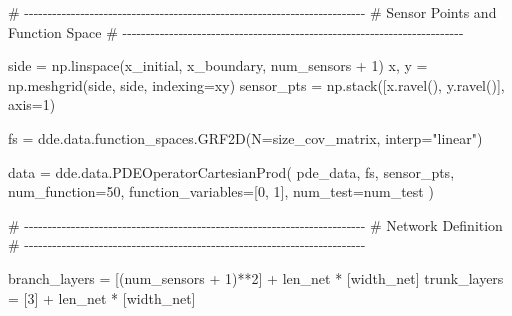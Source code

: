 \documentclass[
  spanish,
  us-letterpaper,
  DIV=11,
  numbers=noendperiod]{scrreprt}
\newenvironment{Shaded}{\begin{snugshade}}{\end{snugshade}}
\newcommand{\CommentTok}[1]{\textcolor[rgb]{0.37,0.37,0.37}{#1}}
\newcommand{\DecValTok}[1]{\textcolor[rgb]{0.68,0.00,0.00}{#1}}
\newcommand{\NormalTok}[1]{\textcolor[rgb]{0.00,0.23,0.31}{#1}}
\newcommand{\OperatorTok}[1]{\textcolor[rgb]{0.37,0.37,0.37}{#1}}
\newcommand{\StringTok}[1]{\textcolor[rgb]{0.13,0.47,0.30}{#1}}
\theoremstyle{plain}
\theoremstyle{definition}
\theoremstyle{remark}
\begin{document}
\begin{Shaded}
\begin{Highlighting}[]
\CommentTok{\# {-}{-}{-}{-}{-}{-}{-}{-}{-}{-}{-}{-}{-}{-}{-}{-}{-}{-}{-}{-}{-}{-}{-}{-}{-}{-}{-}{-}{-}{-}{-}{-}{-}{-}{-}{-}{-}{-}{-}{-}{-}{-}{-}{-}{-}{-}{-}{-}{-}{-}{-}{-}{-}{-}{-}{-}{-}{-}{-}{-}{-}{-}{-}{-}{-}{-}{-}{-}{-}{-}{-}{-}{-}}
\CommentTok{\# Sensor Points and Function Space}
\CommentTok{\# {-}{-}{-}{-}{-}{-}{-}{-}{-}{-}{-}{-}{-}{-}{-}{-}{-}{-}{-}{-}{-}{-}{-}{-}{-}{-}{-}{-}{-}{-}{-}{-}{-}{-}{-}{-}{-}{-}{-}{-}{-}{-}{-}{-}{-}{-}{-}{-}{-}{-}{-}{-}{-}{-}{-}{-}{-}{-}{-}{-}{-}{-}{-}{-}{-}{-}{-}{-}{-}{-}{-}{-}{-}}

\NormalTok{side }\OperatorTok{=}\NormalTok{ np.linspace(x\_initial, x\_boundary, num\_sensors }\OperatorTok{+} \DecValTok{1}\NormalTok{)}
\NormalTok{x, y }\OperatorTok{=}\NormalTok{ np.meshgrid(side, side, indexing}\OperatorTok{=}\StringTok{\textquotesingle{}xy\textquotesingle{}}\NormalTok{)}
\NormalTok{sensor\_pts }\OperatorTok{=}\NormalTok{ np.stack([x.ravel(), y.ravel()], axis}\OperatorTok{=}\DecValTok{1}\NormalTok{)}

\NormalTok{fs }\OperatorTok{=}\NormalTok{ dde.data.function\_spaces.GRF2D(N}\OperatorTok{=}\NormalTok{size\_cov\_matrix, }
\NormalTok{                                    interp}\OperatorTok{=}\StringTok{"linear"}\NormalTok{)}

\NormalTok{data }\OperatorTok{=}\NormalTok{ dde.data.PDEOperatorCartesianProd(}
\NormalTok{    pde\_data,}
\NormalTok{    fs,}
\NormalTok{    sensor\_pts,}
\NormalTok{    num\_function}\OperatorTok{=}\DecValTok{50}\NormalTok{,}
\NormalTok{    function\_variables}\OperatorTok{=}\NormalTok{[}\DecValTok{0}\NormalTok{, }\DecValTok{1}\NormalTok{],}
\NormalTok{    num\_test}\OperatorTok{=}\NormalTok{num\_test}
\NormalTok{)}

\CommentTok{\# {-}{-}{-}{-}{-}{-}{-}{-}{-}{-}{-}{-}{-}{-}{-}{-}{-}{-}{-}{-}{-}{-}{-}{-}{-}{-}{-}{-}{-}{-}{-}{-}{-}{-}{-}{-}{-}{-}{-}{-}{-}{-}{-}{-}{-}{-}{-}{-}{-}{-}{-}{-}{-}{-}{-}{-}{-}{-}{-}{-}{-}{-}{-}{-}{-}{-}{-}{-}{-}{-}{-}{-}{-}}
\CommentTok{\# Network Definition}
\CommentTok{\# {-}{-}{-}{-}{-}{-}{-}{-}{-}{-}{-}{-}{-}{-}{-}{-}{-}{-}{-}{-}{-}{-}{-}{-}{-}{-}{-}{-}{-}{-}{-}{-}{-}{-}{-}{-}{-}{-}{-}{-}{-}{-}{-}{-}{-}{-}{-}{-}{-}{-}{-}{-}{-}{-}{-}{-}{-}{-}{-}{-}{-}{-}{-}{-}{-}{-}{-}{-}{-}{-}{-}{-}{-}}

\NormalTok{branch\_layers }\OperatorTok{=}\NormalTok{ [(num\_sensors }\OperatorTok{+} \DecValTok{1}\NormalTok{)}\OperatorTok{**}\DecValTok{2}\NormalTok{] }\OperatorTok{+}\NormalTok{ len\_net }\OperatorTok{*}\NormalTok{ [width\_net]}
\NormalTok{trunk\_layers }\OperatorTok{=}\NormalTok{ [}\DecValTok{3}\NormalTok{] }\OperatorTok{+}\NormalTok{ len\_net }\OperatorTok{*}\NormalTok{ [width\_net]}


\end{Highlighting}
\end{Shaded}
\end{document}
